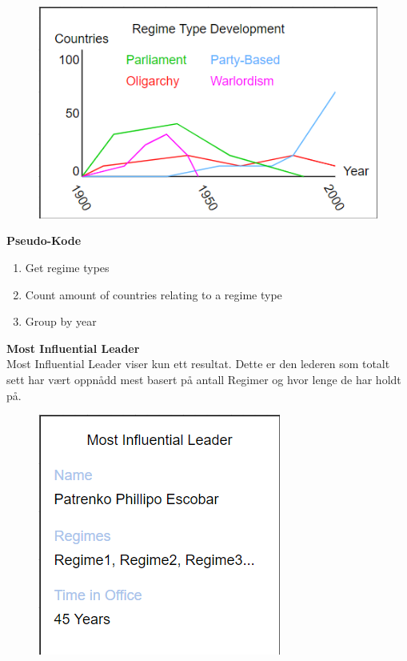 \FigureCounter
\begin{figure}[H]
  \includegraphics[scale=1]{images/milepael4/regimeTypeDevelopment.png}
\end{figure}

\textbf{Pseudo-Kode}
\begin{enumerate}
  \item Get regime types
  \item Count amount of countries relating to a regime type
  \item Group by year
\end{enumerate}

\textbf{Most Influential Leader}\\
Most Influential Leader viser kun ett resultat. Dette er den lederen som totalt sett har vært oppnådd 
mest basert på antall Regimer og hvor lenge de har holdt på.

\FigureCounter
\begin{figure}[H]
  \includegraphics[scale=1]{images/milepael4/mostInfluentialLeader.png}
\end{figure}

